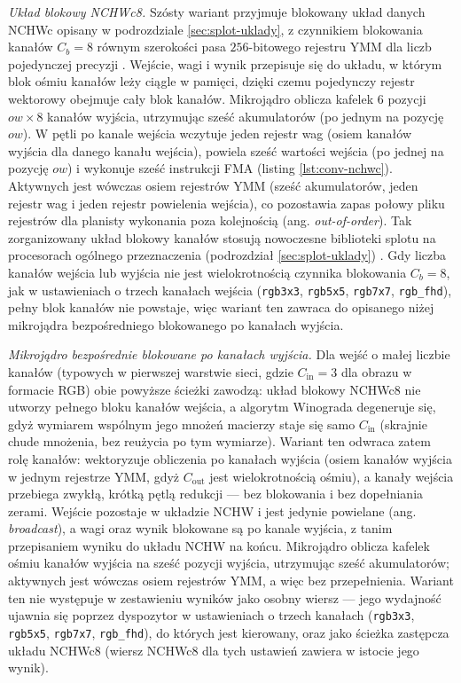 \documentclass[a4paper,12pt]{book} %
\begin{document}
\emph{Układ blokowy NCHWc8.} Szósty wariant przyjmuje blokowany układ danych NCHWc opisany w podrozdziale \ref{sec:splot-uklady}, z czynnikiem blokowania kanałów $C_b = 8$ równym szerokości pasa $256$-bitowego rejestru YMM dla liczb pojedynczej precyzji \cite{georganas2018conv,onednn_memory_formats}. Wejście, wagi i wynik przepisuje się do układu, w którym blok ośmiu kanałów leży ciągle w pamięci, dzięki czemu pojedynczy rejestr wektorowy obejmuje cały blok kanałów. Mikrojądro oblicza kafelek $6$ pozycji $ow \times 8$ kanałów wyjścia, utrzymując sześć akumulatorów (po jednym na pozycję $ow$). W pętli po kanale wejścia wczytuje jeden rejestr wag (osiem kanałów wyjścia dla danego kanału wejścia), powiela sześć wartości wejścia (po jednej na pozycję $ow$) i wykonuje sześć instrukcji FMA (listing \ref{lst:conv-nchwc}). Aktywnych jest wówczas osiem rejestrów YMM (sześć akumulatorów, jeden rejestr wag i jeden rejestr powielenia wejścia), co pozostawia zapas połowy pliku rejestrów dla planisty wykonania poza kolejnością (ang. \emph{out-of-order}). Tak zorganizowany układ blokowy kanałów stosują nowoczesne biblioteki splotu na procesorach ogólnego przeznaczenia (podrozdział \ref{sec:splot-uklady}) \cite{georganas2018conv,onednn_memory_formats}. Gdy liczba kanałów wejścia lub wyjścia nie jest wielokrotnością czynnika blokowania $C_b = 8$, jak w ustawieniach o trzech kanałach wejścia (\texttt{rgb3x3}, \texttt{rgb5x5}, \texttt{rgb7x7}, \texttt{rgb\_fhd}), pełny blok kanałów nie powstaje, więc wariant ten zawraca do opisanego niżej mikrojądra bezpośredniego blokowanego po kanałach wyjścia.

\emph{Mikrojądro bezpośrednie blokowane po kanałach wyjścia.} Dla wejść o małej liczbie kanałów (typowych w pierwszej warstwie sieci, gdzie $C_{\mathrm{in}} = 3$ dla obrazu w formacie RGB) obie powyższe ścieżki zawodzą: układ blokowy NCHWc8 nie utworzy pełnego bloku kanałów wejścia, a algorytm Winograda degeneruje się, gdyż wymiarem wspólnym jego mnożeń macierzy staje się samo $C_{\mathrm{in}}$ (skrajnie chude mnożenia, bez reużycia po tym wymiarze). Wariant ten odwraca zatem rolę kanałów: wektoryzuje obliczenia po kanałach wyjścia (osiem kanałów wyjścia w jednym rejestrze YMM, gdyż $C_{\mathrm{out}}$ jest wielokrotnością ośmiu), a kanały wejścia przebiega zwykłą, krótką pętlą redukcji --- bez blokowania i bez dopełniania zerami. Wejście pozostaje w układzie NCHW i jest jedynie powielane (ang. \emph{broadcast}), a wagi oraz wynik blokowane są po kanale wyjścia, z tanim przepisaniem wyniku do układu NCHW na końcu. Mikrojądro oblicza kafelek ośmiu kanałów wyjścia na sześć pozycji wyjścia, utrzymując sześć akumulatorów; aktywnych jest wówczas osiem rejestrów YMM, a więc bez przepełnienia. Wariant ten nie występuje w zestawieniu wyników jako osobny wiersz --- jego wydajność ujawnia się poprzez dyspozytor w ustawieniach o trzech kanałach (\texttt{rgb3x3}, \texttt{rgb5x5}, \texttt{rgb7x7}, \texttt{rgb\_fhd}), do których jest kierowany, oraz jako ścieżka zastępcza układu NCHWc8 (wiersz NCHWc8 dla tych ustawień zawiera w istocie jego wynik).
\end{document}
